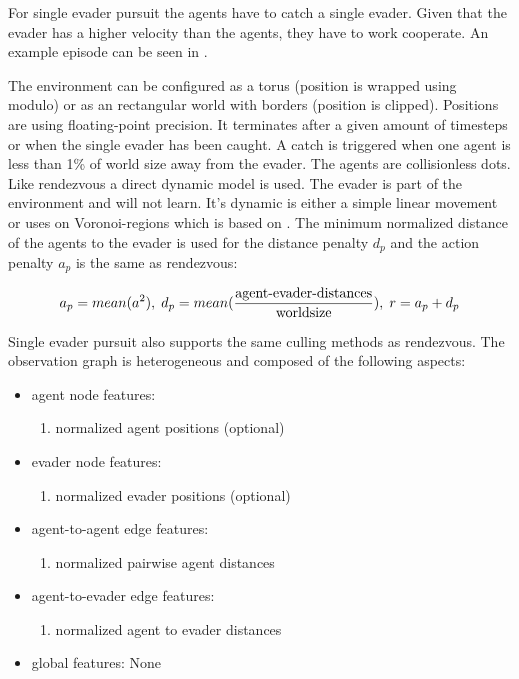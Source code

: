 For single evader pursuit the agents have to catch a single evader. Given that the evader has a higher velocity than the agents, they have to work cooperate. An example episode can be seen in .\par

The environment can be configured as a torus (position is wrapped using modulo) or as an rectangular world with borders (position is clipped). Positions are using floating-point precision. It terminates after a given amount of timesteps or when the single evader has been caught. A catch is triggered when one agent is less than 1\% of world size away from the evader.
The agents are collisionless dots. Like rendezvous a direct dynamic model is used. The evader is part of the environment and will not learn. It's dynamic is either a simple linear movement or uses on Voronoi-regions which is based on \citet{ZHOU201664}.
The minimum normalized distance of the agents to the evader is used for the distance penalty $d_p$ and the action penalty $a_p$ is the same as rendezvous:

\begin{equation} 
    a_p = mean(a^2),\; d_p = mean(\frac{\textup{agent-evader-distances}}{\textup{worldsize}}),\; r = a_p + d_p  \nonumber
\end{equation}

Single evader pursuit also supports the same culling methods as rendezvous. The observation graph is heterogeneous and composed of the following aspects:
\begin{itemize}[noitemsep,nolistsep]
    \item agent node features:
    \begin{enumerate}
        \item normalized agent positions (optional)
    \end{enumerate} 
    \item evader node features:
    \begin{enumerate}
        \item normalized evader positions (optional)
    \end{enumerate}
    \item agent-to-agent edge features:
    \begin{enumerate}
        \item normalized pairwise agent distances
    \end{enumerate} 
    \item agent-to-evader edge features:
    \begin{enumerate}
        \item normalized agent to evader distances
    \end{enumerate} 
    \item global features: None
\end{itemize}



